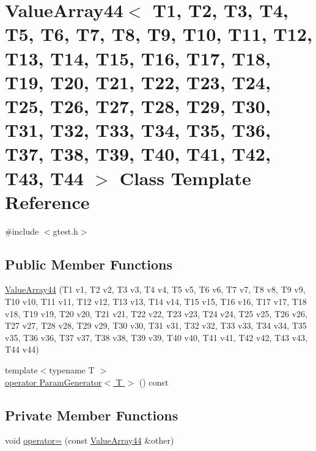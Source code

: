 \hypertarget{classtesting_1_1internal_1_1ValueArray44}{\section{\-Value\-Array44$<$ \-T1, \-T2, \-T3, \-T4, \-T5, \-T6, \-T7, \-T8, \-T9, \-T10, \-T11, \-T12, \-T13, \-T14, \-T15, \-T16, \-T17, \-T18, \-T19, \-T20, \-T21, \-T22, \-T23, \-T24, \-T25, \-T26, \-T27, \-T28, \-T29, \-T30, \-T31, \-T32, \-T33, \-T34, \-T35, \-T36, \-T37, \-T38, \-T39, \-T40, \-T41, \-T42, \-T43, \-T44 $>$ \-Class \-Template \-Reference}
\label{d7/d4e/classtesting_1_1internal_1_1ValueArray44}
}


{\ttfamily \#include $<$gtest.\-h$>$}

\subsection*{\-Public \-Member \-Functions}
\begin{DoxyCompactItemize}
\item 
\hyperlink{classtesting_1_1internal_1_1ValueArray44_a78dbdfa2b4a2b9ee95b02f7a9396f8b0}{\-Value\-Array44} (\-T1 v1, \-T2 v2, \-T3 v3, \-T4 v4, \-T5 v5, \-T6 v6, \-T7 v7, \-T8 v8, \-T9 v9, \-T10 v10, \-T11 v11, \-T12 v12, \-T13 v13, \-T14 v14, \-T15 v15, \-T16 v16, \-T17 v17, \-T18 v18, \-T19 v19, \-T20 v20, \-T21 v21, \-T22 v22, \-T23 v23, \-T24 v24, \-T25 v25, \-T26 v26, \-T27 v27, \-T28 v28, \-T29 v29, \-T30 v30, \-T31 v31, \-T32 v32, \-T33 v33, \-T34 v34, \-T35 v35, \-T36 v36, \-T37 v37, \-T38 v38, \-T39 v39, \-T40 v40, \-T41 v41, \-T42 v42, \-T43 v43, \-T44 v44)
\item 
{\footnotesize template$<$typename T $>$ }\\\hyperlink{classtesting_1_1internal_1_1ValueArray44_a08ef46fa12c9dd8ef6fc630baeea89b7}{operator Param\-Generator$<$ T $>$} () const 
\end{DoxyCompactItemize}
\subsection*{\-Private \-Member \-Functions}
\begin{DoxyCompactItemize}
\item 
void \hyperlink{classtesting_1_1internal_1_1ValueArray44_af8b03d64176f2668fb115624f8508aec}{operator=} (const \hyperlink{classtesting_1_1internal_1_1ValueArray44}{\-Value\-Array44} \&other)
\end{DoxyCompactItemize}
